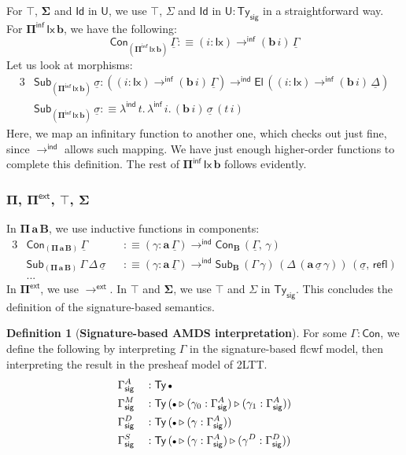 \documentclass[12pt,a4paper,twoside,openany]{book}
\theoremstyle{remark}
\theoremstyle{definition}
\newtheorem{mydefinition}{Definition}
\theoremstyle{theorem}
\newcommand{\ms}[1]{\mathsf{#1}}
\newcommand{\bs}[1]{\boldsymbol{#1}}
\newcommand{\toind}{\to^{\ms{ind}}}
\newcommand{\Tys}{\ms{Ty_{sig}}}
\newcommand{\refl}{\mathsf{refl}}
\newcommand{\Con}{\mathsf{Con}}
\newcommand{\Sub}{\mathsf{Sub}}
\newcommand{\Ty}{\mathsf{Ty}}
\newcommand{\U}{\mathsf{U}}
\newcommand{\El}{\mathsf{El}}
\newcommand{\Id}{\mathsf{Id}}
\newcommand{\ext}{\triangleright}
\newcommand{\emptycon}{\scaleobj{.75}\bullet}
\newcommand{\Pie}{\Pi^{\mathsf{ext}}}
\newcommand{\toe}{\to^{\ms{ext}}}
\newcommand{\Piinf}{\Pi^{\mathsf{inf}}}
\newcommand{\toinf}{\to^{\ms{inf}}}
\newcommand{\lambdainf}{\lambda^{\ms{inf}}}
\newcommand{\ba}{\bs{a}}
\newcommand{\bb}{\bs{b}}
\newcommand{\bB}{\bs{B}}
\newcommand{\bU}{\bs{\U}}
\newcommand{\bPiinf}{\bs{\Piinf}}
\newcommand{\bId}{\bs{\Id}}
\newcommand{\ul}[1]{\underline{#1}}
\newcommand{\ulGamma}{\ul{\Gamma}}
\newcommand{\ulDelta}{\ul{\Delta}}
\newcommand{\ulsigma}{\ul{\sigma}}
\newcommand{\defn}{:\equiv}
\begin{document}
For $\bs{\top}$, $\bs{\Sigma}$ and $\bId$ in $\bU$, we use $\top$, $\Sigma$ and
$\Id$ in $\U : \Tys$ in a straightforward way. For $\bPiinf\,\ms{Ix}\,\bb$, we
have the following:
\[
   \Con_{(\bPiinf\,\ms{Ix}\,\bb)}\,\ulGamma \defn (i : \ms{Ix}) \toinf (\bb\,i)\,\ulGamma
\]
Let us look at morphisms:
\begin{alignat*}{3}
  &\Sub_{(\bPiinf\,\ms{Ix}\,\bb)}\,\ulsigma : ((i : \ms{Ix}) \toinf (\bb\,i)\,\ulGamma)
    \toind \El\,((i : \ms{Ix}) \toinf (\bb\,i)\,\ulDelta)\\
  &\Sub_{(\bPiinf\,\ms{Ix}\,\bb)}\,\ulsigma \defn \lambda^{\ms{ind}}\,t.\,\lambdainf\,i.\,
    (\bb\,i)\,\ulsigma\,(t\,i)
\end{alignat*}
Here, we map an infinitary function to another one, which checks out just fine,
since $\toind$ allows such mapping. We have just enough higher-order functions
to complete this definition. The rest of $\bPiinf\,\ms{Ix}\,\bb$ follows evidently.

\subsubsection{$\bs{\Pi}$, $\bs{\Pie}$, $\bs{\top}$, $\bs{\Sigma}$}

In $\bs{\Pi\,a\,B}$, we use inductive functions in components:
\begin{alignat*}{3}
  &\Con_{(\bs{\Pi\,a\,B})}\,\ulGamma &&\defn (\gamma : \ba\,\ulGamma) \toind \Con_{\bB}\,(\ulGamma,\,\gamma)\\
  &\Sub_{(\bs{\Pi\,a\,B})}\,\Gamma\,\Delta\,\ulsigma &&\defn (\gamma : \ba\,\ulGamma) \toind \Sub_{\bB}\,(\Gamma\,\gamma)\,(\Delta\,(\ba\,\ulsigma\,\gamma))\,(\ulsigma,\,\refl)\\
  & ... &&
\end{alignat*}
In $\bs{\Pie}$, we use $\toe$. In $\bs{\top}$ and $\bs{\Sigma}$, we use $\top$ and $\Sigma$ in $\Tys$. This concludes the definition of the signature-based semantics.

\begin{mydefinition}[\textbf{Signature-based AMDS interpretation}]
For some $\Gamma : \Con$, we define the following by interpreting $\Gamma$ in
the signature-based flcwf model, then interpreting the result in the presheaf
model of 2LTT.
\begin{alignat*}{3}
  &\Gamma^A_{\ms{sig}} &&: \Ty\,\emptycon \\
  &\Gamma^M_{\ms{sig}} &&: \Ty\,(\emptycon\ext(\gamma_0 : \Gamma^A_{\ms{sig}})\ext(\gamma_1 : \Gamma^A_{\ms{sig}}))\\
  &\Gamma^D_{\ms{sig}} &&: \Ty\,(\emptycon\ext(\gamma : \Gamma^A_{\ms{sig}}))\\
  &\Gamma^S_{\ms{sig}} &&: \Ty\,(\emptycon\ext(\gamma : \Gamma^A_{\ms{sig}})\ext(\gamma^D : \Gamma^D_{\ms{sig}}))
\end{alignat*}
\end{mydefinition}
\end{document}
